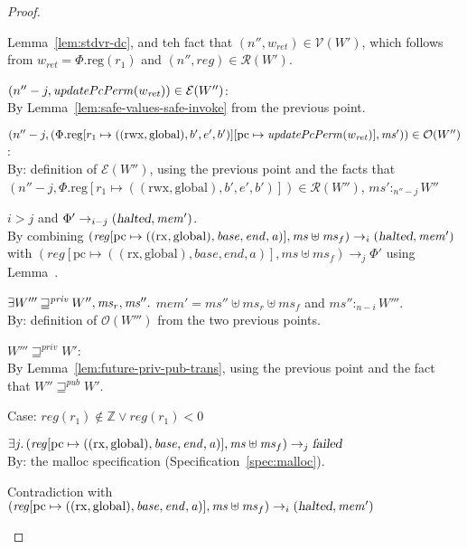 \documentclass[a4paper]{article}
\newcommand{\update}[2]{[#1 \mapsto #2]}
\newcommand{\var}[1]{\mathit{#1}}
\newcommand{\hs}{\var{ms}}
\newcommand{\ms}{\hs}
\newcommand{\pcreg}{\mathrm{pc}}
\newcommand{\addr}{\var{a}}
\newcommand{\start}{\var{base}}
\newcommand{\addrend}{\var{end}}
\newcommand{\mem}{\var{mem}}
\newcommand{\reg}{\var{reg}}
\newcommand{\heap}{\var{mem}}
\newcommand{\plainproj}[1]{\mathrm{#1}}
\newcommand{\memreg}[1][\Phi]{#1.\plainproj{reg}}
\newcommand{\failed}{\textsl{failed}}
\newcommand{\halted}{\textsl{halted}}
\newcommand{\plainfun}[2]{
  \ifthenelse{\equal{#2}{}}
  {\mathit{#1}}
  {\mathit{#1}(#2)}
}
\newcommand{\updatePcPerm}[1]{\plainfun{updatePcPerm}{#1}}
\newcommand{\futurewk}{\mathbin{\sqsupseteq}^{\var{pub}}}
\newcommand{\futurestr}{\mathbin{\sqsupseteq}^{\var{priv}}}
\newcommand{\heapSat}[3][\heap]{#1 :_{#2} #3}
\newcommand{\asmType}{\plaindom{AsmType}}
\newcommand{\plaindom}[1]{\mathrm{#1}}
\newcommand{\ints}{\mathbb{Z}}
\newcommand{\intr}[2]{\mathcal{#1}}
\newcommand{\valueintr}[1]{\intr{V}{#1}}
\newcommand{\exprintr}[1]{\intr{E}{#1}}
\newcommand{\regintr}[1]{\intr{R}{#1}}
\newcommand{\stdvr}{\valueintr{\asmType}}
\newcommand{\stder}{\exprintr{\asmType}}
\newcommand{\stdrr}{\regintr{\asmType}}
\newcommand{\observations}{\mathcal{O}}
\newcommand{\npair}[2][n]{\left(#1,#2 \right)}
\newcommand{\plainperm}[1]{\mathrm{#1}}
\newcommand{\exec}{\plainperm{rx}}
\newcommand{\rwx}{\plainperm{rwx}}
\newcommand{\glob}{\plainperm{global}}
\newcommand{\step}[1][]{\rightarrow_{#1}}
\begin{document}
\begin{proof}
\begin{enumproof}
\begin{enumproof}
      Lemma~\ref{lem:stdvr-dc}, and teh fact that
      $\npair[n'']{w_{\var{ret}}}\in\stdvr(W')$, which follows from
      $w_{\var{ret}} = \memreg(r_1)$ and $\npair[n'']{\reg}\in\stdrr(W')$.
    \item $\npair[n''-j]{\updatePcPerm{w_{\var{ret}}}} \in \stder(W'')$:\\
      By Lemma~\ref{lem:safe-values-safe-invoke} from the previous point.
    \item
      $\npair[n''-j]{(\memreg[\Phi]\update{r_1}{((\rwx,\glob),b',e',b')}\update{\pcreg}{\updatePcPerm{w_{\var{ret}}}},
        \ms')} \in \observations(W'')$:\\
      By: definition of $\stder(W'')$, using the previous point and the facts
      that
      $\npair[n''-j]{\memreg[\Phi]\update{r_1}{((\rwx,\glob),b',e',b')}}\in\stdrr(W'')$,
      $\heapSat[\ms']{n''-j}{W''}$
    \item $i > j$ and $\Phi'\step[i-j]
      (\halted,\mem')$.\\
      By combining
      $(\reg\update{\pcreg}{((\exec,\glob),\start,\addrend,\addr)},\ms\uplus\ms_f)\step[i]
      (\halted,\mem')$ with
      $(\reg\update{\pcreg}{((\exec,\glob),\start,\addrend,\addr)},\ms\uplus\ms_f)
      \step[j] \Phi'$ using Lemma~\label{lem:determinacy}.
    \item $\exists W''' \futurestr W'', \hs_r, \hs'' \ldotp$ $\heap' = \hs'' \uplus \hs_r \uplus \ms_f$ and $\heapSat[\hs'']{n-i}{W'''}$.\\
      By: definition of $\observations(W''')$ from the two previous points.
    \item $W''' \futurestr W'$: \\
      By Lemma~\ref{lem:future-priv-pub-trans}, using the previous point and the fact that $W'' \futurewk
      W'$.
    \end{enumproof}
  \item Case: $\reg(r_1)\not\in\ints \vee \reg(r_1) < 0$
    \begin{enumproof}
    \item $\exists j\ldotp (\reg\update{\pcreg}{((\exec,\glob),\start,\addrend,\addr)},\ms\uplus\ms_f)\step[j]
      \failed$\\
      By: the malloc specification (Specification~\ref{spec:malloc}).
    \item Contradiction with 
      $(\reg\update{\pcreg}{((\exec,\glob),\start,\addrend,\addr)},\ms\uplus\ms_f)\step[i]
      (\halted,\mem')$
    \end{enumproof}
  \end{enumproof}
\end{proof}
\end{document}
